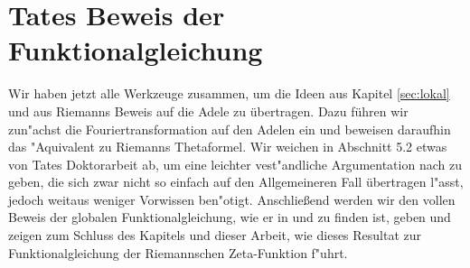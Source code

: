 \section{Tates Beweis der Funktionalgleichung}\label{sec:tateproof}
	Wir haben jetzt alle Werkzeuge zusammen, um die Ideen aus Kapitel \ref{sec:lokal} und aus Riemanns Beweis auf die Adele zu übertragen.
	Dazu führen wir zun"achst die Fouriertransformation auf den Adelen ein und beweisen daraufhin das "Aquivalent zu Riemanns Thetaformel.
	Wir weichen in Abschnitt 5.2 etwas von Tates Doktorarbeit ab, um eine leichter vest"andliche Argumentation nach \textcite{deitmar2010} zu geben, die sich zwar nicht so einfach auf den Allgemeineren Fall übertragen l"asst, jedoch weitaus weniger Vorwissen ben"otigt.
	Anschließend werden wir den vollen Beweis der globalen Funktionalgleichung, wie er in \textcite{tate} und \textcite{rama} zu finden ist, geben und zeigen zum Schluss des Kapitels und dieser Arbeit, wie dieses Resultat zur Funktionalgleichung der Riemannschen Zeta-Funktion f"uhrt.
		
